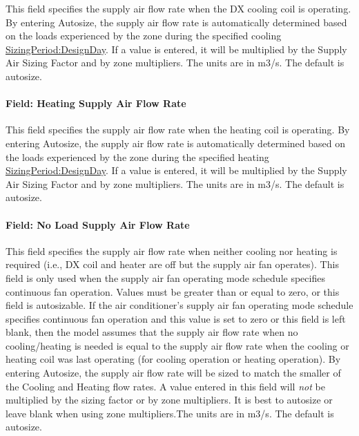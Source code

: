 This field specifies the supply air flow rate when the DX cooling coil is operating. By entering Autosize, the supply air flow rate is automatically determined based on the loads experienced by the zone during the specified cooling \hyperref[sizingperioddesignday]{SizingPeriod:DesignDay}. If a value is entered, it will be multiplied by the Supply Air Sizing Factor and by zone multipliers. The units are in m3/s. The default is autosize.

\paragraph{Field: Heating Supply Air Flow Rate}\label{field-heating-supply-air-flow-rate-000}

This field specifies the supply air flow rate when the heating coil is operating. By entering Autosize, the supply air flow rate is automatically determined based on the loads experienced by the zone during the specified heating \hyperref[sizingperioddesignday]{SizingPeriod:DesignDay}. If a value is entered, it will be multiplied by the Supply Air Sizing Factor and by zone multipliers. The units are in m3/s. The default is autosize.

\paragraph{Field: No Load Supply Air Flow Rate}\label{field-no-load-supply-air-flow-rate}

This field specifies the supply air flow rate when neither cooling nor heating is required (i.e., DX coil and heater are off but the supply air fan operates). This field is only used when the supply air fan operating mode schedule specifies continuous fan operation. Values must be greater than or equal to zero, or this field is autosizable. If the air conditioner's supply air fan operating mode schedule specifies continuous fan operation and this value is set to zero or this field is left blank, then the model assumes that the supply air flow rate when no cooling/heating is needed is equal to the supply air flow rate when the cooling or heating coil was last operating (for cooling operation or heating operation). By entering Autosize, the supply air flow rate will be sized to match the smaller of the Cooling and Heating flow rates. A value entered in this field will \emph{not} be multiplied by the sizing factor or by zone multipliers. It is best to autosize or leave blank when using zone multipliers.The units are in m3/s. The default is autosize.

